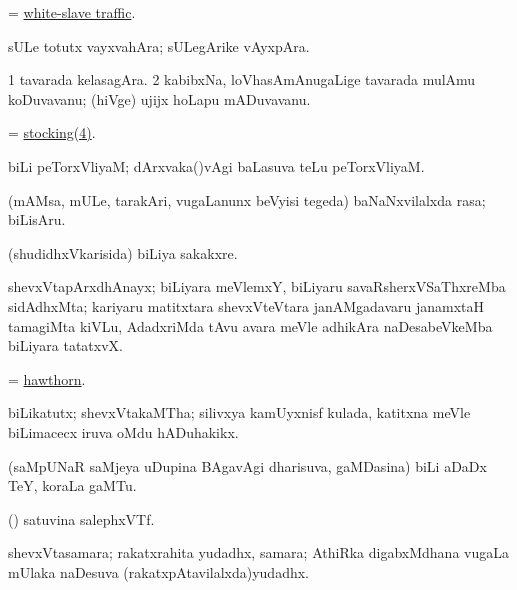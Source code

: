 \bentry
{}
\gl{\nA}
\bmng
= \hyperlink{white-slave traffic}{white-slave traffic}. 
\emng
\eentry

\bentry
{}
\gl{\nA}
\bmng
sULe totutx vayxvahAra; sULegArike vAyxpAra. 
\emng
\eentry

\bentry
{}
\gl{\nA}
\bmng
\bnum
\num{1} tavarada kelasagAra. 
\num{2} kabibxNa, loVhasAmAnugaLige tavarada mulAmu koDuvavanu; (hiVge) ujijx hoLapu mADuvavanu. 
\enum
\emng
\eentry

\bentry
{}
\gl{\nA}
\bmng
= \hyperref{kandict_s.pdf}{S}{stocking(4)}{stocking(4)}. 
\emng
\eentry

\bentry
{}
\gl{\nA}
\bmng
biLi peTorxVliyaM; dArxvaka(\mo)vAgi baLasuva teLu peTorxVliyaM. 
\emng
\eentry

\bentry
{}
\gl{\nA}
\bmng
(mAMsa, mULe, tarakAri, \mo vugaLanunx beVyisi tegeda) baNaNxvilalxda rasa; biLisAru. 
\emng
\eentry

\bentry
{}
\gl{\nA}
\bmng
(shudidhxVkarisida) biLiya sakakxre. 
\emng
\eentry

\bentry
{}
\gl{\nA}
\bmng
shevxVtapArxdhAnayx; biLiyara meVlemxY, biLiyaru savaRsherxVSaThxreMba sidAdhxMta; kariyaru matitxtara shevxVteVtara janAMgadavaru janamxtaH tamagiMta kiVLu, AdadxriMda tAvu avara meVle adhikAra naDesabeVkeMba biLiyara tatatxvX. 
\emng
\eentry

\bentry
{}
\gl{\nA}
\bmng
= \hyperref{kandict_h.pdf}{H}{hawthorn}{hawthorn}. 
\emng
\eentry

\bentry
{}
\gl{\nA}
\bmng
biLikatutx; shevxVtakaMTha; silivxya kamUyxnisf kulada, katitxna meVle biLimacecx iruva oMdu hADuhakikx. 
\emng
\eentry

\bentry
{}
\gl{\nA}
\bmng
(saMpUNaR saMjeya uDupina BAgavAgi dharisuva, gaMDasina) biLi aDaDx TeY, koraLa gaMTu. 
\emng
\eentry

\bentry
{}
\gl{\nA}
\bmng
(\ravi) satuvina salephxVTf. 
\emng
\eentry

\bentry
{}
\gl{\nA}
\bmng
shevxVtasamara; rakatxrahita yudadhx, samara; AthiRka digabxMdhana \mo vugaLa mUlaka naDesuva (rakatxpAtavilalxda)yudadhx. 
\emng
\eentry

